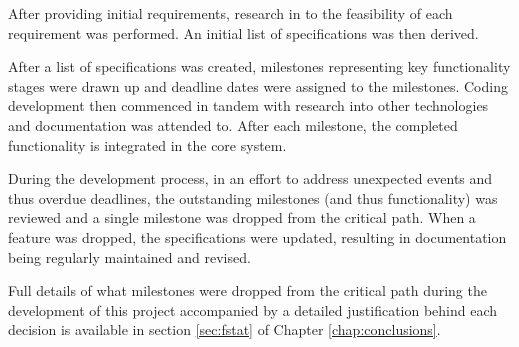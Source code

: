 After providing initial requirements, research in to the feasibility of
each requirement was performed. An initial list of specifications was
then derived.


After a list of specifications was created, milestones representing key
functionality stages were drawn up and deadline dates were assigned to
the milestones. Coding development then commenced in tandem with 
research into other technologies and documentation was attended to. 
After each milestone, the completed functionality is integrated in the
core system.


During the development process, in an effort to address unexpected 
events and thus overdue deadlines, the outstanding milestones (and thus 
functionality) was reviewed and a single milestone was dropped from the 
critical path. When a feature was dropped, the specifications were 
updated, resulting in documentation being regularly maintained and 
revised.


Full details of what milestones were dropped from the critical path
during the development of this project accompanied by a detailed
justification behind each decision is available in 
section \ref{sec:fstat} of Chapter \ref{chap:conclusions}.
